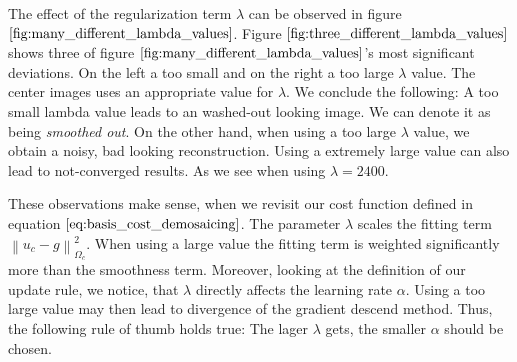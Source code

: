 \documentclass{paper}
\newcommand{\norm}[1]{\left\lVert#1\right\rVert}
\begin{document}
The effect of the regularization term $\lambda$ can be observed in figure $\ref{fig:many_different_lambda_values}$. Figure $\ref{fig:three_different_lambda_values}$ shows three of figure $\ref{fig:many_different_lambda_values}$'s most significant deviations. On the left a too small and on the right a too large $\lambda$ value. The center images uses an appropriate value for $\lambda$. We conclude the following: A too small lambda value leads to an washed-out looking image. We can denote it as being \emph{smoothed out}. On the other hand, when using a too large $\lambda$ value, we obtain a noisy, bad looking reconstruction. Using a extremely large value can also lead to not-converged results. As we see when using $\lambda=2400$.

These observations make sense, when we revisit our cost function defined in equation $\ref{eq:basis_cost_demosaicing}$. The parameter $\lambda$ scales the fitting term $\norm{u_c - g}^2_{\Omega_{c}}$. When using a large value the fitting term is weighted significantly more than the smoothness term. Moreover, looking at the definition of our update rule, we notice, that $\lambda$ directly affects the learning rate $\alpha$. Using a too large value may then lead to divergence of the gradient descend method. Thus, the following rule of thumb holds true: The lager $\lambda$ gets, the smaller $\alpha$ should be chosen.
\end{document}
